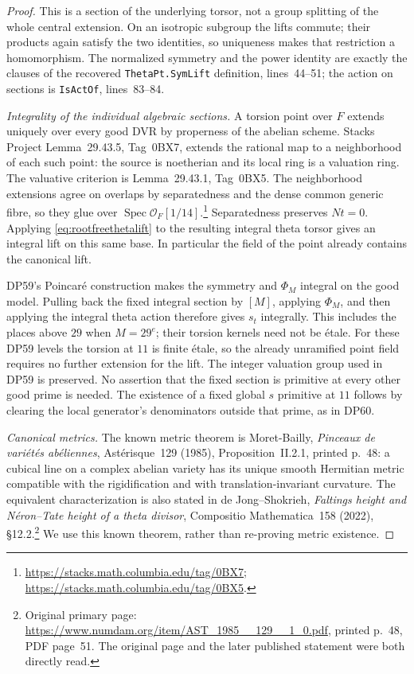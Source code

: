 \begin{proof}
This is a section of the underlying torsor, not a group splitting of the whole central extension.
On an isotropic subgroup the lifts commute; their products again satisfy the two identities, so uniqueness makes that restriction a homomorphism.
The normalized symmetry and the power identity are exactly the clauses of the recovered \texttt{ThetaPt.SymLift} definition, lines~44--51; the action on sections is \texttt{IsActOf}, lines~83--84.

\emph{Integrality of the individual algebraic sections.}
A torsion point over $F$ extends uniquely over every good DVR by properness of the abelian scheme.
Stacks Project Lemma~29.43.5, Tag~0BX7, extends the rational map to a neighborhood of each such point: the source is noetherian and its local ring is a valuation ring.
The valuative criterion is Lemma~29.43.1, Tag~0BX5.
The neighborhood extensions agree on overlaps by separatedness and the dense common generic fibre, so they glue over $\operatorname{Spec}\mathcal O_F[1/14]$.\footnote{\url{https://stacks.math.columbia.edu/tag/0BX7}; \url{https://stacks.math.columbia.edu/tag/0BX5}.}
Separatedness preserves $Nt=0$.
Applying \eqref{eq:rootfreethetalift} to the resulting integral theta torsor gives an integral lift on this same base.
In particular the field of the point already contains the canonical lift.

DP59's Poincar\'e construction makes the symmetry and $\Phi_M$ integral on the good model.
Pulling back the fixed integral section by $[M]$, applying $\Phi_M$, and then applying the integral theta action therefore gives $s_t$ integrally.
This includes the places above $29$ when $M=29^e$; their torsion kernels need not be \'etale.
For these DP59 levels the torsion at $11$ is finite \'etale, so the already unramified point field requires no further extension for the lift.
The integer valuation group used in DP59 is preserved.
No assertion that the fixed section is primitive at every other good prime is needed.
The existence of a fixed global $s$ primitive at $11$ follows by clearing the local generator's denominators outside that prime, as in DP60.

\emph{Canonical metrics.}
The known metric theorem is Moret-Bailly, \emph{Pinceaux de vari\'et\'es ab\'eliennes}, Ast\'erisque~129 (1985), Proposition~II.2.1, printed p.~48: a cubical line on a complex abelian variety has its unique smooth Hermitian metric compatible with the rigidification and with translation-invariant curvature.
The equivalent characterization is also stated in de Jong--Shokrieh, \emph{Faltings height and N\'eron--Tate height of a theta divisor}, Compositio Mathematica~158 (2022), \S12.2.\footnote{Original primary page: \url{https://www.numdam.org/item/AST_1985__129__1_0.pdf}, printed p.~48, PDF page~51. The original page and the later published statement were both directly read.}
We use this known theorem, rather than re-proving metric existence.


\end{proof}
